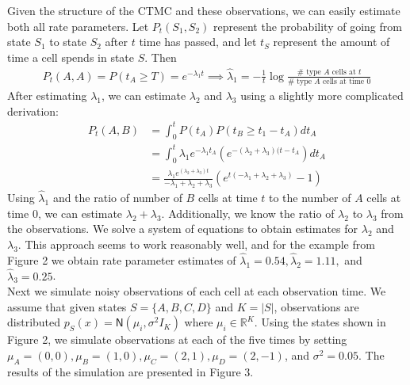 \documentclass[11pt,onecolumn]{article}
\begin{document}
Given the structure of the CTMC and these observations, we can easily estimate both all rate parameters. Let $P_t(S_1,S_2)$ represent the probability of going from state $S_1$ to state $S_2$ after $t$ time has passed, and let $t_S$ represent the amount of time a cell spends in state $S$. Then
\begin{align*}
	P_t(A,A) = P(t_A \geq T) = e^{-\lambda_1 t} \implies \hat{\lambda}_1 = -\frac{1}{t} \log \frac{\# \mbox{ type $A$ cells at $t$}}{\# \mbox{ type $A$ cells at time 0}}
\end{align*}
After estimating $\lambda_1$, we can estimate $\lambda_2$ and $\lambda_3$ using a slightly more complicated derivation:
\begin{align*}
	P_t(A,B) & = \int_0^t P(t_A) P(t_B \geq t_1 - t_A) dt_A \\
	& = \int_0^t \lambda_1 e^{-\lambda_1 t_A} (e^{-(\lambda_2+\lambda_3)(t-t_A})dt_A \\
	& = \frac{\lambda_1 e^{(\lambda_2+\lambda_3)t}}{-\lambda_1+\lambda_2 + \lambda_3} \left(e^{t(-\lambda_1 + \lambda_2 + \lambda_3)}-1 \right)
\end{align*}
Using $\hat{\lambda}_1$ and the ratio of number of $B$ cells at time $t$ to the number of $A$ cells at time 0, we can estimate $\lambda_2 + \lambda_3$. Additionally, we know the ratio of $\lambda_2$ to $\lambda_3$ from the observations. We solve a system of equations to obtain estimates for $\lambda_2$ and $\lambda_3$. This approach seems to work reasonably well, and for the example from Figure 2 we obtain rate parameter estimates of $\hat{\lambda}_1 = 0.54, \hat{\lambda}_2 = 1.11,$ and $\hat{\lambda}_3 = 0.25$. \\

Next we simulate noisy observations of each cell at each observation time. We assume that given states $S = \{A,B,C,D\}$ and $K = |S|$, observations are distributed $p_S(x) = \textsf{N}(\mu_i,\sigma^2 I_K)$ where $\mu_i \in \mathbb{R}^K$. Using the states shown in Figure 2, we simulate observations at each of the five times by setting $\mu_A = (0,0), \mu_B = (1,0), \mu_C = (2,1), \mu_D = (2,-1)$, and $\sigma^2 = 0.05$. The results of the simulation are presented in Figure 3.
\end{document}
